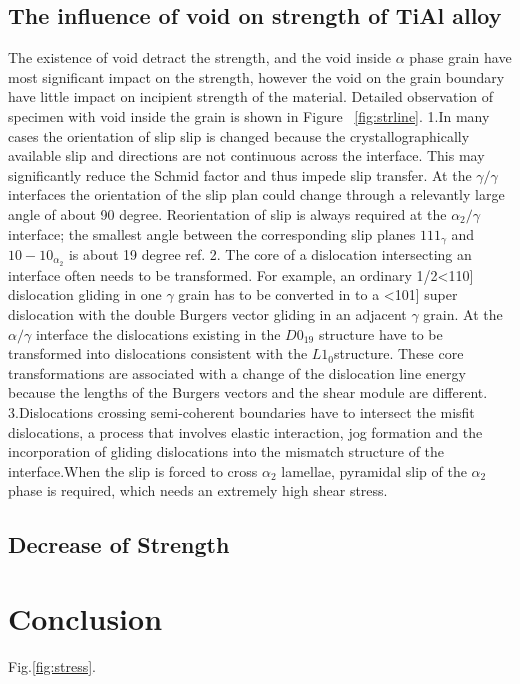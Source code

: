 \documentclass[final,5p,times,twocolumn]{elsarticle}
\begin{document}
\subsection{The influence of void on strength of TiAl alloy}
The existence of void detract the strength, and the void inside $\alpha$ phase grain have most significant  impact on the strength, however the void on the grain boundary have little impact on incipient strength of the material. Detailed observation of specimen with void inside the grain is shown in Figure ~\ref{fig:strline}.
1.In many cases the orientation of slip slip is changed because the crystallographically available slip and directions are not continuous across the interface. This may significantly reduce the Schmid factor and thus impede slip transfer. At the $\gamma/\gamma$ interfaces the orientation of the slip plan could change through a relevantly large angle of about 90 degree. Reorientation of slip is always required at the $\alpha_{2} / \gamma$ interface; the smallest angle between the corresponding slip planes ${1 1 1 }_{\gamma}$ and ${ 1 0 -1 0}_{\alpha_2}$ is about 19 degree ref{}.
2. The core of  a dislocation intersecting an interface often needs to be transformed. For example, an ordinary 1/2<110] dislocation gliding in one $\gamma$ grain has to be converted in to a <101] super dislocation with the double Burgers vector gliding in an adjacent $\gamma$ grain. At the $\alpha/\gamma$ interface the dislocations existing in the $D0_{19}$ structure have to be transformed into dislocations consistent with the $L1_0$structure. These core transformations are associated with a change of the dislocation line energy because the lengths of the Burgers vectors and the shear module are different.
3.Dislocations crossing semi-coherent boundaries have to intersect the misfit dislocations, a process that involves elastic interaction, jog formation and the incorporation of gliding dislocations into the mismatch structure of the interface.When the slip is forced to cross $\alpha_2$ lamellae, pyramidal slip of the $\alpha_2$ phase is required, which needs an extremely high shear stress.
\subsection{Decrease of Strength}
\section{Conclusion}

Fig.\ref{fig:stress}.
\end{document}
